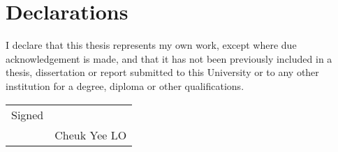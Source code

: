 

\chapter*{Declarations}

I declare that this thesis represents my own work, except where due acknowledgement is made, and that it has not been previously included in a thesis, dissertation or report submitted to this University or to any other institution for a degree, diploma or other qualifications.%

\bigskip
\bigskip
\bigskip
\bigskip
\bigskip
\bigskip
\bigskip
\bigskip

\begin{flushright}
    \begin{tabular}{p{1cm} p{4cm}}
        Signed & \dotfill \\
           & \center Cheuk Yee LO\\
    \end{tabular}
\end{flushright}

\bigskip
\bigskip
\bigskip
